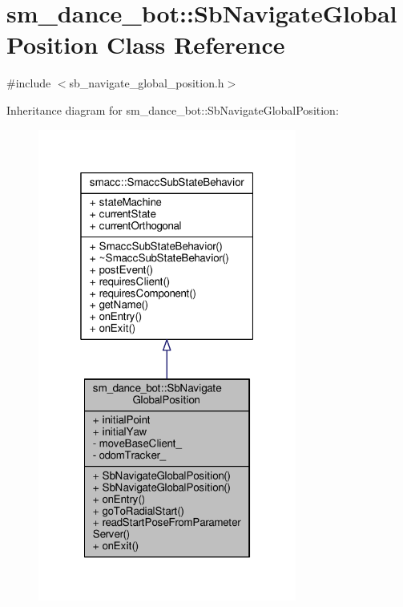 \hypertarget{classsm__dance__bot_1_1SbNavigateGlobalPosition}{}\section{sm\+\_\+dance\+\_\+bot\+:\+:Sb\+Navigate\+Global\+Position Class Reference}
\label{classsm__dance__bot_1_1SbNavigateGlobalPosition}


{\ttfamily \#include $<$sb\+\_\+navigate\+\_\+global\+\_\+position.\+h$>$}



Inheritance diagram for sm\+\_\+dance\+\_\+bot\+:\+:Sb\+Navigate\+Global\+Position\+:
\nopagebreak
\begin{figure}[H]
\begin{center}
\leavevmode
\includegraphics[width=241pt]{classsm__dance__bot_1_1SbNavigateGlobalPosition__inherit__graph}
\end{center}
\end{figure}


